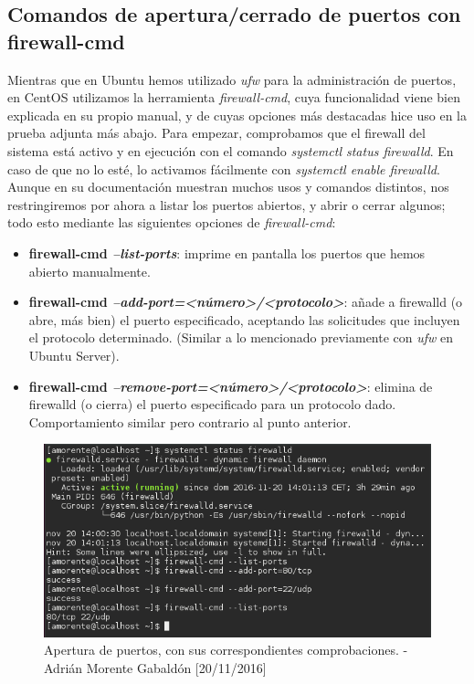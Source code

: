 	\subsection{Comandos de apertura/cerrado de puertos con firewall-cmd}
	Mientras que en Ubuntu hemos utilizado \emph{ufw} para la administración de puertos, en CentOS utilizamos la herramienta \emph{firewall-cmd}, cuya funcionalidad viene bien explicada en su propio manual, y de cuyas opciones más destacadas hice uso en la prueba adjunta más abajo.
	Para empezar, comprobamos que el firewall del sistema está activo y en ejecución con el comando \emph{systemctl status firewalld}. En caso de que no lo esté, lo activamos fácilmente con \emph{systemctl enable firewalld}.
	Aunque en su documentación muestran muchos usos y comandos distintos, nos restringiremos por ahora a listar los puertos abiertos, y abrir o cerrar algunos; todo esto mediante las siguientes opciones de \emph{firewall-cmd}:
	\begin{itemize}
		\item \textbf{firewall-cmd \emph{--list-ports}}: imprime en pantalla los puertos que hemos abierto manualmente.
		\item \textbf{firewall-cmd \emph{--add-port=<número>/<protocolo>}}: añade a firewalld (o abre, más bien) el puerto especificado, aceptando las solicitudes que incluyen el protocolo determinado. (Similar a lo mencionado previamente con \emph{ufw} en Ubuntu Server).
		\item \textbf{firewall-cmd \emph{--remove-port=<número>/<protocolo>}}: elimina de firewalld (o cierra) el puerto especificado para un protocolo dado. Comportamiento similar pero contrario al punto anterior.
	\end{itemize}
	\begin{figure}[H]
		\centering
		\includegraphics[scale=0.6]{firewall-ports}
		\caption{Apertura de puertos, con sus correspondientes comprobaciones. - Adrián Morente Gabaldón [20/11/2016]}
		\label{fig:figura2}
	\end{figure}

